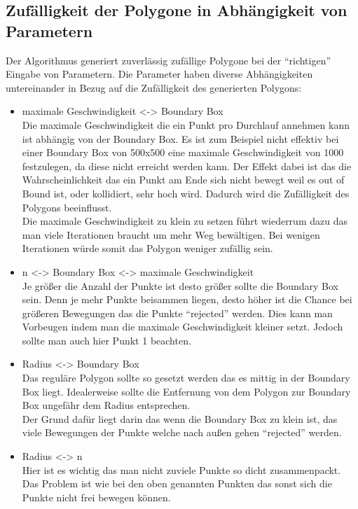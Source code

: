 \subsection{Zufälligkeit der Polygone in Abhängigkeit von Parametern}
Der Algorithmus generiert zuverlässig zufällige Polygone bei der \enquote{richtigen} Eingabe von Parametern. Die Parameter haben diverse Abhängigkeiten untereinander in Bezug auf die Zufälligkeit des generierten Polygons:\\
\begin{itemize}
	\item maximale Geschwindigkeit <-> Boundary Box\\
	Die maximale Geschwindigkeit die ein Punkt pro Durchlauf annehmen kann ist abhängig von der Boundary Box. Es ist zum Beispiel nicht effektiv bei einer Boundary Box von 500x500 eine maximale Geschwindigkeit von 1000 festzulegen, da diese nicht erreicht werden kann. Der Effekt dabei ist das die Wahrscheinlichkeit das ein Punkt am Ende sich nicht bewegt weil es out of Bound ist, oder kollidiert, sehr hoch wird. Dadurch wird die Zufälligkeit des Polygons beeinflusst.\\
	Die maximale Geschwindigkeit zu klein zu setzen führt wiederrum dazu das man viele Iterationen braucht um mehr Weg bewältigen. Bei wenigen Iterationen würde somit das Polygon weniger zufällig sein.
	\item n <-> Boundary Box <-> maximale Geschwindigkeit\\
	Je größer die Anzahl der Punkte ist desto größer sollte die Boundary Box sein. Denn je mehr Punkte beisammen liegen, desto höher ist die Chance bei größeren Bewegungen das die Punkte \enquote{rejected} werden. Dies kann man Vorbeugen indem man die maximale Geschwindigkeit kleiner setzt. Jedoch sollte man auch hier Punkt 1 beachten.
	\item Radius <-> Boundary Box\\
	Das reguläre Polygon sollte so gesetzt werden das es mittig in der Boundary Box liegt. Idealerweise sollte die Entfernung von dem Polygon zur Boundary Box ungefähr dem Radius entsprechen.\\
	Der Grund dafür liegt darin das wenn die Boundary Box zu klein ist, das viele Bewegungen der Punkte welche nach außen gehen \enquote{rejected} werden.
	\item Radius <-> n\\
	Hier ist es wichtig das man nicht zuviele Punkte so dicht zusammenpackt. Das Problem ist wie bei den oben genannten Punkten das sonst sich die Punkte nicht frei bewegen können.
\end{itemize}
